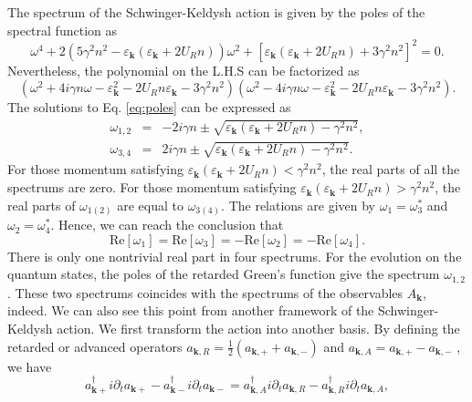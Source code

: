 \documentclass[aps,superscriptaddress,notitlepage,longbibliography]{revtex4-1}
\begin{document}
The spectrum of the Schwinger-Keldysh action is given by the poles
of the spectral function as 
\begin{equation}
\omega^{4}+2(5\gamma^{2}n^{2}-\varepsilon_{\bm{k}}(\varepsilon_{\bm{k}}+2U_{R}n))\omega^{2}+[\varepsilon_{\bm{k}}(\varepsilon_{\bm{k}}+2U_{R}n)+3\gamma^{2}n^{2}]^{2}=0.
\end{equation}
Nevertheless, the polynomial on the L.H.S can be factorized as 
\begin{equation}
(\omega^{2}+4i\gamma n\omega-\varepsilon_{\bm{k}}^{2}-2U_{R}n\varepsilon_{\bm{k}}-3\gamma^{2}n^{2})(\omega^{2}-4i\gamma n\omega-\varepsilon_{\bm{k}}^{2}-2U_{R}n\varepsilon_{\bm{k}}-3\gamma^{2}n^{2}).\label{eq:poles}
\end{equation}
The solutions to Eq. \eqref{eq:poles} can be expressed as 
\begin{eqnarray}
\omega_{1,2} & = & -2i\gamma n\pm\sqrt{\varepsilon_{\bm{k}}(\varepsilon_{\bm{k}}+2U_{R}n)-\gamma^{2}n^{2}},\\
\omega_{3,4} & = & 2i\gamma n\pm\sqrt{\varepsilon_{\bm{k}}(\varepsilon_{\bm{k}}+2U_{R}n)-\gamma^{2}n^{2}}.
\end{eqnarray}
For those momentum satisfying $\varepsilon_{\bm{k}}(\varepsilon_{\bm{k}}+2U_{R}n)<\gamma^{2}n^{2}$,
the real parts of all the spectrums are zero. For those momentum satisfying
$\varepsilon_{\bm{k}}(\varepsilon_{\bm{k}}+2U_{R}n)>\gamma^{2}n^{2}$,
the real parts of $\omega_{1(2)}$ are equal to $\omega_{3(4)}$.
The relations are given by $\omega_{1}=\omega_{3}^{\ast}$ and $\omega_{2}=\omega_{4}^{\ast}$.
Hence, we can reach the conclusion that 
\begin{equation}
\text{Re}[\omega_{1}]=\text{Re}[\omega_{3}]=-\text{Re}[\omega_{2}]=-\text{Re}[\omega_{4}].
\end{equation}
There is only one nontrivial real part in four spectrums. For the
evolution on the quantum states, the poles of the retarded Green's
function give the spectrum $\omega_{1,2}$. These two spectrums coincides
with the spectrums of the observables $A_{\bm{k}}$, indeed. We can
also see this point from another framework of the Schwinger-Keldysh
action. We first transform the action into another basis. By defining
the retarded or advanced operators $a_{\bm{k},R}=\frac{1}{2}(a_{\bm{k},+}+a_{\bm{k},-})$
and $a_{\bm{k},A}=a_{\bm{k},+}-a_{\bm{k},-}$ \citep{Kamenev_2011},
we have 
\begin{equation}
a_{\bm{k}+}^{\dagger}i\partial_{t}a_{\bm{k}+}-a_{\bm{k}-}^{\dagger}i\partial_{t}a_{\bm{k}-}=a_{\bm{k},A}^{\dagger}i\partial_{t}a_{\bm{k},R}-a_{\bm{k},R}^{\dagger}i\partial_{t}a_{\bm{k},A},
\end{equation}
\end{document}
